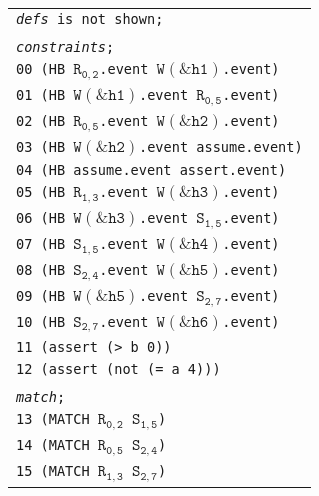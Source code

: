 \newsavebox{\boxSMTb}
\begin{lrbox}{\boxSMTb}
\begin{minipage}[c]{0.4\linewidth}
\begin{tabular}[t]{l}
\texttt{\textit{defs} is not shown;}\\
\\
\texttt{\textit{constraints};}\\
\texttt{00 (HB $\mathtt{R_{0,2}}$.event $\mathtt{W(\&h1)}$.event)}\\
\texttt{01 (HB $\mathtt{W(\&h1)}$.event $\mathtt{R_{0,5}}$.event)}\\
\texttt{02 (HB $\mathtt{R_{0,5}}$.event $\mathtt{W(\&h2)}$.event)}\\
\texttt{03 (HB $\mathtt{W(\&h2)}$.event assume.event)}\\
\texttt{04 (HB assume.event assert.event)}\\
\texttt{05 (HB $\mathtt{R_{1,3}}$.event $\mathtt{W(\&h3)}$.event)}\\
\texttt{06 (HB $\mathtt{W(\&h3)}$.event $\mathtt{S_{1,5}}$.event)}\\
\texttt{07 (HB $\mathtt{S_{1,5}}$.event $\mathtt{W(\&h4)}$.event)}\\
\texttt{08 (HB $\mathtt{S_{2,4}}$.event $\mathtt{W(\&h5)}$.event)}\\
\texttt{09 (HB $\mathtt{W(\&h5)}$.event $\mathtt{S_{2,7}}$.event)}\\
\texttt{10 (HB $\mathtt{S_{2,7}}$.event $\mathtt{W(\&h6)}$.event)}\\
\texttt{11 (assert (> b 0))}\\
\texttt{12 (assert (not (= a 4)))}\\
\\
\texttt{\textit{match};}\\
\texttt{13 (MATCH $\mathtt{R_{0,2}}$ $\mathtt{S_{1,5}}$)}\\
\texttt{14 (MATCH $\mathtt{R_{0,5}}$ $\mathtt{S_{2,4}}$)}\\
\texttt{15 (MATCH $\mathtt{R_{1,3}}$ $\mathtt{S_{2,7}}$)}\\

\end{tabular}
\end{minipage}
\end{lrbox}

